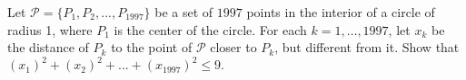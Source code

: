 Let $\mathcal{P} = \{P_1, P_2, ..., P_{1997}\}$ be a set of $1997$ points in the interior of a circle of radius 1, where $P_1$ is the center of the circle.
For each $k=1, \dots, 1997$, let $x_k$ be the distance of $P_k$ to the point of $\mathcal{P}$ closer to $P_k$, but different from it. Show that $(x_1)^2 + (x_2)^2 + ... + (x_{1997})^2 \le 9.$
